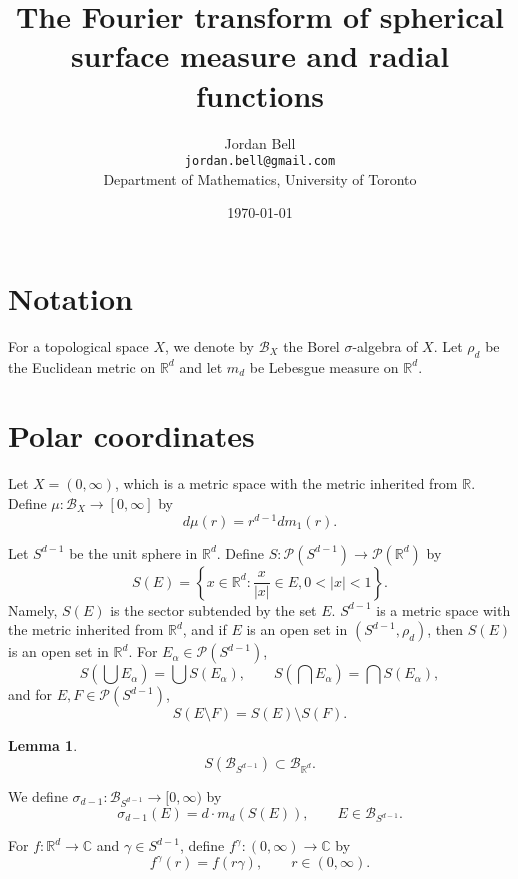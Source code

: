 \documentclass{article}
\newtheorem{lemma}[theorem]{Lemma}
\begin{document}
\title{The Fourier transform of spherical surface  measure and radial functions}
\author{Jordan Bell\\ \texttt{jordan.bell@gmail.com}\\Department of Mathematics, University of Toronto}
\date{\today}

\maketitle

\section{Notation}
For a topological space $X$, we denote by $\mathscr{B}_X$ the Borel $\sigma$-algebra of $X$.
Let $\rho_d$ be the Euclidean metric on $\mathbb{R}^d$ and let $m_d$ be Lebesgue measure on $\mathbb{R}^d$. 


\section{Polar coordinates}
Let $X=(0,\infty)$, which is a metric space with the metric inherited from $\mathbb{R}$.
Define $\mu:\mathscr{B}_X \to [0,\infty]$ by
\[
d\mu(r)=r^{d-1} dm_1(r).
\]

Let $S^{d-1}$ be the unit sphere in $\mathbb{R}^d$.
Define $S:\mathscr{P}(S^{d-1}) \to \mathscr{P}(\mathbb{R}^d)$ by
\[
S(E) = \left\{x \in \mathbb{R}^d: \frac{x}{|x|} \in E, 0 < |x| < 1 \right\}.
\]
Namely, $S(E)$ is the sector subtended by the set $E$.
$S^{d-1}$ is a metric space with the metric inherited from $\mathbb{R}^d$, and 
if $E$ is an open set in $(S^{d-1},\rho_d)$, then $S(E)$ is an open set in $\mathbb{R}^d$. 
For $E_\alpha \in \mathscr{P}(S^{d-1})$,
\[
S\left( \bigcup E_\alpha \right) = \bigcup S(E_\alpha),
\qquad S\left( \bigcap E_\alpha \right) = \bigcap S(E_\alpha),
\]
and for $E,F \in \mathscr{P}(S^{d-1})$,
\[
S(E \setminus F) = S(E) \setminus S(F).
\]

\begin{lemma}
\[
S ( \mathscr{B}_{S^{d-1}}) \subset \mathscr{B}_{\mathbb{R}^d}.
\]
\end{lemma}

We define $\sigma_{d-1}:\mathscr{B}_{S^{d-1}} \to [0,\infty)$ by
\[
\sigma_{d-1}(E) = d \cdot m_d(S(E)),
\qquad E \in \mathscr{B}_{S^{d-1}}.
\]

For $f:\mathbb{R}^d \to \mathbb{C}$ and $\gamma \in S^{d-1}$, define $f^\gamma:(0,\infty) \to \mathbb{C}$ by
\[
f^\gamma(r) = f(r\gamma), \qquad r \in (0,\infty).
\]
\end{document}
